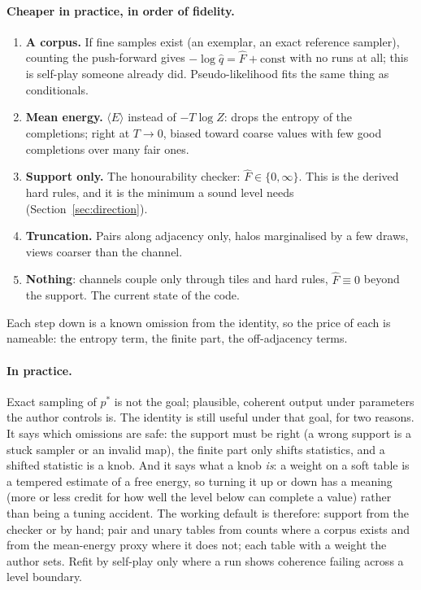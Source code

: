 \documentclass[11pt]{article}
\newcommand{\1}{\mathds{1}}
\begin{document}
\paragraph{Cheaper in practice, in order of fidelity.}
\begin{enumerate}
  \item \textbf{A corpus.} If fine samples exist (an exemplar, an exact reference
        sampler), counting the push-forward gives $-\log \hat q = \hat F + \text{const}$
        with no runs at all; this is self-play someone already did.
        Pseudo-likelihood fits the same thing as conditionals.
  \item \textbf{Mean energy.} $\langle E \rangle$ instead of $-T \log Z$: drops the
        entropy of the completions; right at $T \to 0$, biased toward coarse
        values with few good completions over many fair ones.
  \item \textbf{Support only.} The honourability checker: $\hat F \in \{0, \infty\}$.
        This is the derived hard rules, and it is the minimum a sound level
        needs (Section~\ref{sec:direction}).
  \item \textbf{Truncation.} Pairs along adjacency only, halos marginalised by
        a few draws, views coarser than the channel.
  \item \textbf{Nothing}: channels couple only through tiles and hard rules,
        $\hat F \equiv 0$ beyond the support. The current state of the code.
\end{enumerate}
Each step down is a known omission from the identity, so the price of each
is nameable: the entropy term, the finite part, the off-adjacency terms.

\paragraph{In practice.} Exact sampling of $p^*$ is not the goal; plausible,
coherent output under parameters the author controls is. The identity is
still useful under that goal, for two reasons. It says which omissions are
safe: the support must be right (a wrong support is a stuck sampler or an
invalid map), the finite part only shifts statistics, and a shifted statistic
is a knob. And it says what a knob \emph{is}: a weight on a soft table is a
tempered estimate of a free energy, so turning it up or down has a meaning (more
or less credit for how well the level below can complete a value) rather than
being a tuning accident. The working default is therefore: support from the
checker or by hand; pair and unary tables from counts where a corpus exists and
from the mean-energy proxy where it does not; each table with a weight the
author sets. Refit by self-play only where a run shows coherence failing across
a level boundary.
\end{document}
